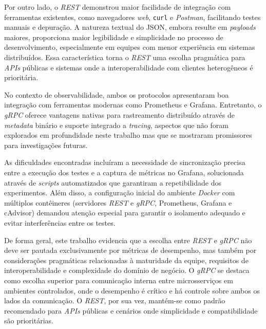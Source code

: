 Por outro lado, o \textit{REST} demonstrou maior facilidade de integração com ferramentas existentes, como navegadores \textit{web}, \texttt{curl} e \textit{Postman}, facilitando testes manuais e depuração. A natureza textual do JSON, embora resulte em \textit{payloads} maiores, proporciona maior legibilidade e simplicidade no processo de desenvolvimento, especialmente em equipes com menor experiência em sistemas distribuídos. Essa característica torna o \textit{REST} uma escolha pragmática para \textit{APIs} públicas e sistemas onde a interoperabilidade com clientes heterogêneos é prioritária.

No contexto de observabilidade, ambos os protocolos apresentaram boa integração com ferramentas modernas como Prometheus e Grafana. Entretanto, o \textit{gRPC} oferece vantagens nativas para rastreamento distribuído através de \textit{metadata} binário e suporte integrado a \textit{tracing}, aspectos que não foram explorados em profundidade neste trabalho mas que se mostraram promissores para investigações futuras.

As dificuldades encontradas incluíram a necessidade de sincronização precisa entre a execução dos testes e a captura de métricas no Grafana, solucionada através de \textit{scripts} automatizados que garantiram a repetibilidade dos experimentos. Além disso, a configuração inicial do ambiente \textit{Docker} com múltiplos contêineres (servidores \textit{REST} e \textit{gRPC}, Prometheus, Grafana e cAdvisor) demandou atenção especial para garantir o isolamento adequado e evitar interferências entre os testes.

De forma geral, este trabalho evidencia que a escolha entre \textit{REST} e \textit{gRPC} não deve ser pautada exclusivamente por métricas de desempenho, mas também por considerações pragmáticas relacionadas à maturidade da equipe, requisitos de interoperabilidade e complexidade do domínio de negócio. O \textit{gRPC} se destaca como escolha superior para comunicação interna entre microsserviços em ambientes controlados, onde o desempenho é crítico e há controle sobre ambos os lados da comunicação. O \textit{REST}, por sua vez, mantém-se como padrão recomendado para \textit{APIs} públicas e cenários onde simplicidade e compatibilidade são prioritárias.


